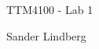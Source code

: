 \documentclass[12pt,a4paper]{article}
\begin{document}
\begin{titlepage}
    \centering
    \vspace*{\fill}

    \vspace*{0.5cm}

    \huge
    TTM4100 - Lab 1

    \vspace*{0.5cm}

    \large Sander Lindberg

    \vspace*{\fill}
    \end{titlepage}

	\newpage
	
\end{document}
